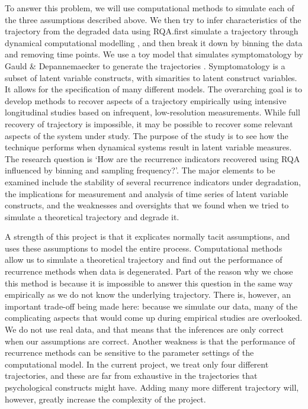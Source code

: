 \documentclass[utf8]{FrontiersinVancouver}
\begin{document}
To answer this problem, we will use computational methods to simulate each of the three assumptions described above. We then try to infer characteristics of the trajectory from the degraded data using RQA.\@We first simulate a trajectory through dynamical computational modelling \citep{grahekAnatomyPsychologicalTheory2021,gauldDynamicalSystemsComputational2023}, and then break it down by binning the data and removing time points. We use a toy model that simulates symptomatology by Gauld \& Depannemaecker to generate the trajectories \citep{gauldDynamicalSystemsComputational2023}. Symptomatology is a subset of latent variable constructs, with  simarities to latent construct variables. It allows for the specification of many different models. The overarching goal is to develop methods to recover aspects of a trajectory empirically using intensive longitudinal studies based on infrequent, low-resolution measurements. While full recovery of trajectory is impossible, it may be possible to recover some relevant aspects of the system under study. The purpose of the study is to see how the technique performs when dynamical systems result in latent variable measures. The research question is `How are the recurrence indicators recovered using RQA influenced by binning and sampling frequency?'. The major elements to be examined include the stability of several recurrence indicators under degradation, the implications for measurement and analysis of time series of latent variable constructs, and the weaknesses and oversights that we found when we tried to simulate a theoretical trajectory and degrade it.  

A strength of this project is that it explicates normally tacit assumptions, and uses these assumptions to model the entire process. Computational methods allow us to simulate a theoretical trajectory and find out the performance of recurrence methods when data is degenerated. Part of the reason why we chose this method is because it is impossible to answer this question in the same way empirically as we do not know the underlying trajectory. There is, however, an important trade-off being made here: because we simulate our data, many of the complicating aspects that would come up during empirical studies are overlooked. We do not use real data, and that means that the inferences are only correct when our assumptions are correct. Another weakness is that the performance of recurrence methods can be sensitive to the parameter settings of the computational model. In the current project, we treat only four different trajectories, and these are far from exhaustive in the trajectories that psychological constructs might have. Adding many more different trajectory will, however, greatly increase the complexity of the project. 
\end{document}
